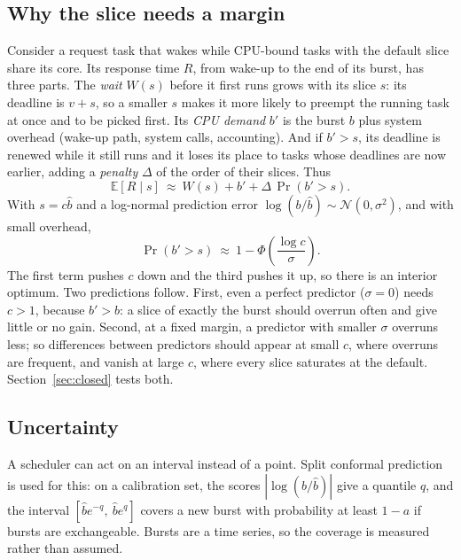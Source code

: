 \documentclass[conference,onecolumn,11pt]{IEEEtran}
\begin{document}
\subsection{Why the slice needs a margin}\label{sec:margin}
Consider a request task that wakes while CPU-bound tasks with the default slice share its core. Its response time $R$, from wake-up to the end of its burst, has three parts. The \emph{wait} $W(s)$ before it first runs grows with its slice $s$: its deadline is $v+s$, so a smaller $s$ makes it more likely to preempt the running task at once and to be picked first. Its \emph{CPU demand} $b'$ is the burst $b$ plus system overhead (wake-up path, system calls, accounting). And if $b'>s$, its deadline is renewed while it still runs and it loses its place to tasks whose deadlines are now earlier, adding a \emph{penalty} $\Delta$ of the order of their slices. Thus
\begin{equation}
\mathbb{E}[R\mid s]\ \approx\ W(s)+b'+\Delta\,\Pr(b'>s).
\end{equation}
With $s=c\hat b$ and a log-normal prediction error $\log(b/\hat b)\sim\mathcal{N}(0,\sigma^2)$, and with small overhead,
\begin{equation}
\Pr(b'>s)\ \approx\ 1-\Phi\!\left(\frac{\log c}{\sigma}\right).
\end{equation}
The first term pushes $c$ down and the third pushes it up, so there is an interior optimum. Two predictions follow. First, even a perfect predictor ($\sigma=0$) needs $c>1$, because $b'>b$: a slice of exactly the burst should overrun often and give little or no gain. Second, at a fixed margin, a predictor with smaller $\sigma$ overruns less; so differences between predictors should appear at small $c$, where overruns are frequent, and vanish at large $c$, where every slice saturates at the default. Section~\ref{sec:closed} tests both.

\subsection{Uncertainty}
A scheduler can act on an interval instead of a point. Split conformal prediction~\cite{vovk2005,angelopoulos2023} is used for this: on a calibration set, the scores $|\log(b/\hat b)|$ give a quantile $q$, and the interval $[\hat b e^{-q},\ \hat b e^{q}]$ covers a new burst with probability at least $1-a$ if bursts are exchangeable. Bursts are a time series, so the coverage is measured rather than assumed.

\end{document}
